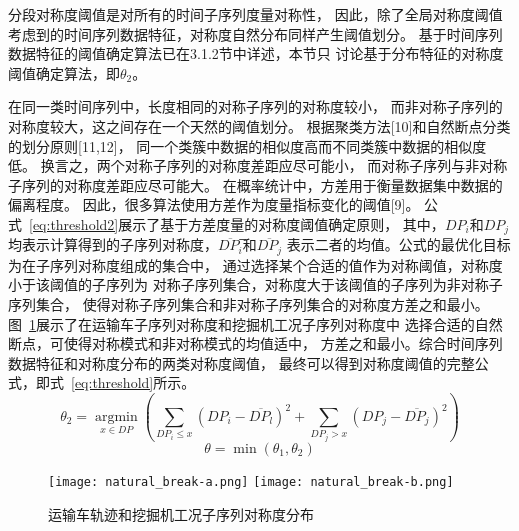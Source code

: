分段对称度阈值是对所有的时间子序列度量对称性，
因此，除了全局对称度阈值
考虑到的时间序列数据特征，对称度自然分布同样产生阈值划分。
基于时间序列数据特征的阈值确定算法已在3.1.2节中详述，本节只
讨论基于分布特征的对称度阈值确定算法，即$\theta_2$。

在同一类时间序列中，长度相同的对称子序列的对称度较小，
而非对称子序列的对称度较大，这之间存在一个天然的阈值划分。
根据聚类方法[10]和自然断点分类的划分原则[11,12]，
同一个类簇中数据的相似度高而不同类簇中数据的相似度低。
换言之，两个对称子序列的对称度差距应尽可能小，
而对称子序列与非对称子序列的对称度差距应尽可能大。
在概率统计中，方差用于衡量数据集中数据的偏离程度。
因此，很多算法使用方差作为度量指标变化的阈值[9]。
公式~\ref{eq:threshold2}展示了基于方差度量的对称度阈值确定原则，
其中，$DP_i$和$DP_j$均表示计算得到的子序列对称度，$\overline{DP_{i}}$̅和$\overline{DP_{j}}$
表示二者的均值。公式的最优化目标为在子序列对称度组成的集合中，
通过选择某个合适的值作为对称阈值，对称度小于该阈值的子序列为
对称子序列集合，对称度大于该阈值的子序列为非对称子序列集合，
使得对称子序列集合和非对称子序列集合的对称度方差之和最小。
图~\ref{fig:natural_break}展示了在运输车子序列对称度和挖掘机工况子序列对称度中
选择合适的自然断点，可使得对称模式和非对称模式的均值适中，
方差之和最小。综合时间序列数据特征和对称度分布的两类对称度阈值，
最终可以得到对称度阈值的完整公式，即式~\ref{eq:threshold}所示。
\begin{equation}
  \theta_{2}=\underset{x \in D P}{\operatorname{argmin}}\left(\sum_{D P_{i} \leq x}\left(D P_{i}-\overline{D P_{l}}\right)^{2}+\sum_{D P_{j}>x}\left(D P_{j}-\overline{D P_{j}}\right)^{2}\right)
  \label{eq:threshold2}
\end{equation}
\begin{equation}
  \theta=\min \left(\theta_{1}, \theta_{2}\right)
  \label{eq:threshold}
\end{equation}
\begin{figure}
  \centering
  {\texttt{[image: natural\_break-a.png]}}
  {\texttt{[image: natural\_break-b.png]}}
  \caption{运输车轨迹和挖掘机工况子序列对称度分布}
  \label{fig:natural_break}
\end{figure}

\renewcommand{\algorithmicrequire}{\textbf{输入：}\unskip}
\renewcommand{\algorithmicensure}{\textbf{输出：}\unskip}

